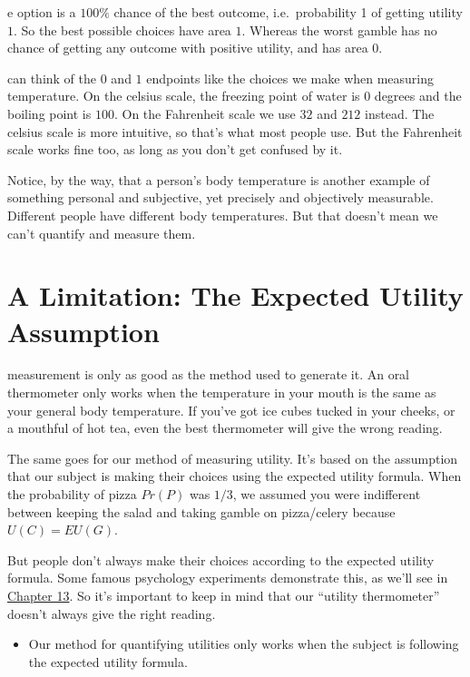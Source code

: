 \documentclass[justified]{tufte-book}
\renewcommand{\u}{U}
\newcommand{\p}{Pr}
\newcommand{\EU}{EU}
\newenvironment{warning}{\begin{itemize}\item[\faBan]}{\end{itemize}}
\theoremstyle{definition}
\theoremstyle{definition}
\theoremstyle{definition}
\theoremstyle{remark}
\begin{document}
e option is a \(100\%\) chance of the best outcome, i.e.~probability 1 of getting utility \(1\). So the best possible choices have area \(1\). Whereas the worst gamble has no chance of getting any outcome with positive utility, and has area \(0\).

 can think of the \(0\) and \(1\) endpoints like the choices we make when measuring temperature. On the celsius scale, the freezing point of water is \(0\) degrees and the boiling point is \(100\). On the Fahrenheit scale we use \(32\) and \(212\) instead. The celsius scale is more intuitive, so that's what most people use. But the Fahrenheit scale works fine too, as long as you don't get confused by it.

Notice, by the way, that a person's body temperature is another example of something personal and subjective, yet precisely and objectively measurable. Different people have different body temperatures. But that doesn't mean we can't quantify and measure them.

\hypertarget{a-limitation-the-expected-utility-assumption}{%
\section{A Limitation: The Expected Utility Assumption}\label{a-limitation-the-expected-utility-assumption}}

 measurement is only as good as the method used to generate it. An oral thermometer only works when the temperature in your mouth is the same as your general body temperature. If you've got ice cubes tucked in your cheeks, or a mouthful of hot tea, even the best thermometer will give the wrong reading.

The same goes for our method of measuring utility. It's based on the assumption that our subject is making their choices using the expected utility formula. When the probability of pizza \(\p(P)\) was \(1/3\), we assumed you were indifferent between keeping the salad and taking gamble on pizza/celery because \(\u(C) = \EU(G)\).

But people don't always make their choices according to the expected utility formula. Some famous psychology experiments demonstrate this, as we'll see in \protect\hyperlink{challenges-to-expected-utility}{Chapter 13}. So it's important to keep in mind that our ``utility thermometer'' doesn't always give the right reading.

\begin{warning}
Our method for quantifying utilities only works when the subject is
following the expected utility formula.
\end{warning}
\end{document}
